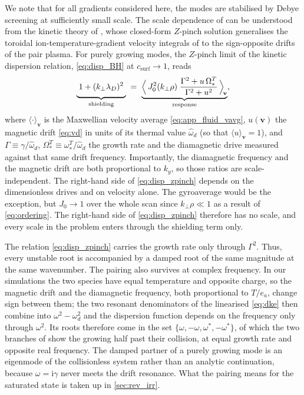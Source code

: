 \documentclass{jpp}
\newcommand{\bv}{\mathbf{v}}
\newcommand{\kperp}{k_\perp}
\newcommand{\lambdaD}{\lambda_D}
\begin{document}
We note that for all gradients considered here, the modes are stabilised by Debye screening at sufficiently small scale. The scale dependence of  can be understood from the kinetic theory of \citet{MPH2018}, whose closed-form $Z$-pinch solution generalises the toroidal ion-temperature-gradient velocity integrals of \citet{Biglari1989} to the sign-opposite drifts of the pair plasma. For purely growing modes, the $Z$-pinch limit of the kinetic dispersion relation, \cref{eq:disp_BH} at $c_\mathrm{surf}\to1$, reads
\begin{equation}\label{eq:disp_zpinch}
\underbrace{\vphantom{\Bigl\langle}\;1 + (\kperp\lambdaD)^2\;}_{\text{shielding}}
\;=\;
\underbrace{\Bigl\langle\, J_0^2(\kperp\rho)\;
\frac{\Gamma^2 + u\,\Omega_*^T}{\Gamma^2 + u^2} \,\Bigr\rangle_{\!\bv}}_{\text{response}} ,
\end{equation}
where $\langle\cdot\rangle_\bv$ is the Maxwellian velocity average \cref{eq:app_fluid_vavg}, $u(\bv)$ the magnetic drift \cref{eq:vd} in units of its thermal value $\hat\omega_d$ (so that $\langle u\rangle_\bv = 1$), and $\Gamma \equiv \gamma/\hat\omega_d$, $\Omega_*^T \equiv \omega_*^T/\hat\omega_d$ the growth rate and the diamagnetic drive measured against that same drift frequency. Importantly, the diamagnetic frequency and the magnetic drift are both proportional to $k_y$, so those ratios are scale-independent. The right-hand side of \cref{eq:disp_zpinch} depends on the dimensionless drives and on velocity alone. The gyroaverage would be the exception, but $J_0\to1$ over the whole scan since $\kperp\rho \ll 1$ as a result of \cref{eq:ordering}. The right-hand side of \cref{eq:disp_zpinch} therefore has no scale, and every scale in the problem enters through the shielding term only.

The relation \cref{eq:disp_zpinch} carries the growth rate only through $\Gamma^2$. Thus, every unstable root is accompanied by a damped root of the same magnitude at the same wavenumber. The pairing also survives at complex frequency. In our simulations the two species have equal temperature and opposite charge, so the magnetic drift and the diamagnetic frequency, both proportional to $T/e_a$, change sign between them; the two resonant denominators of the linearised \cref{eq:dke} then combine into $\omega^2 - \omega_d^2$ and the dispersion function depends on the frequency only through $\omega^2$. Its roots therefore come in the set $\{\omega, -\omega, \omega^*, -\omega^*\}$, of which the two branches of  show the growing half past their collision, at equal growth rate and opposite real frequency. The damped partner of a purely growing mode is an eigenmode of the collisionless system rather than an analytic continuation, because $\omega = \mathrm{i}\gamma$ never meets the drift resonance. What the pairing means for the saturated state is taken up in \cref{sec:rev_irr}.
\end{document}
